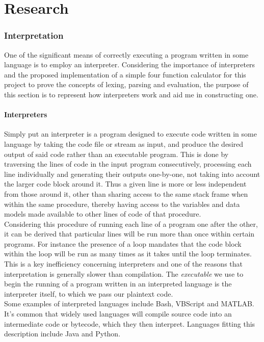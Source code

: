 \documentclass[a4paper, 11pt]{article}
\begin{document}
\clearpage



\part{Research}
\setcounter{section}{0}
\section{Interpretation}
One of the significant means of correctly executing a program written in some language is to employ an interpreter. Considering the importance of interpreters and the proposed implementation of a simple four function calculator for this project to prove the concepts of lexing, parsing and evaluation, the purpose of this section is to represent how interpreters work and aid me in constructing one.

\subsection{Interpreters}
Simply put an interpreter is a program designed to execute code written in some language by taking the code file or stream as input, and produce the desired output of said code rather than an executable program. This is done by traversing the lines of code in the input program consecutively, processing each line individually and generating their outputs one-by-one, not taking into account the larger code block around it. Thus a given line is more or less independent from those around it, other than sharing access to the same stack frame when within the same procedure, thereby having access to the variables and data models made available to other lines of code of that procedure.
\\\newline
Considering this procedure of running each line of a program one after the other, it can be derived that particular lines will be run more than once within certain programs. For instance the presence of a loop mandates that the code block within the loop will be run as many times as it takes until the loop terminates. This is a key inefficiency concerning interpreters and one of the reasons that interpretation is generally slower than compilation. The \textit{executable} we use to begin the running of a program written in an interpreted language is the interpreter itself, to which we pass our plaintext code.
\\\newline
Some examples of interpreted languages include Bash, VBScript and MATLAB. It's common that widely used languages will compile source code into an intermediate code or bytecode, which they then interpret. Languages fitting this description include Java and Python.
\end{document}
